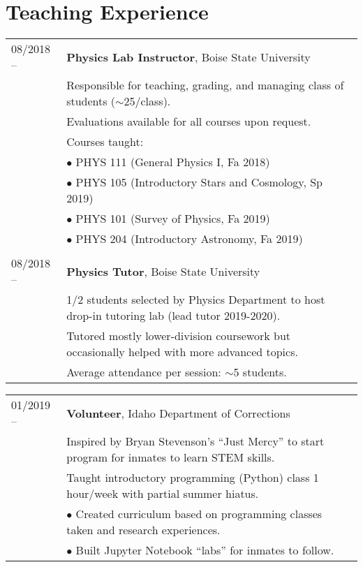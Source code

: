 \documentclass[11pt]{article}
\begin{document}
\section{Teaching Experience}
\begin{tabular}{ll}
08/2018 --		& 	\textbf{Physics Lab Instructor}, Boise State University \vspace{1mm} \\
      & Responsible for teaching, grading, and managing class of students ($\sim$25/class).\\
      & Evaluations available for all courses upon request. \vspace{2mm} \\
      & Courses taught:\\
      & $\bullet$ PHYS 111 (General Physics I, Fa 2018)\\
      & $\bullet$ PHYS 105 (Introductory Stars and Cosmology, Sp 2019)\\
      & $\bullet$ PHYS 101 (Survey of Physics, Fa 2019)\\
      & $\bullet$ PHYS 204 (Introductory Astronomy, Fa 2019)\\
      & \\
08/2018 --    &   \textbf{Physics Tutor}, Boise State University \vspace{1mm} \\
      & 1/2 students selected by Physics Department to host drop-in tutoring lab (lead tutor 2019-2020).\\
      & Tutored mostly lower-division coursework but occasionally helped with more advanced topics.\\
      & Average attendance per session: $\sim$5 students.\\

\end{tabular}
\newpage
\begin{tabular}{ll}
01/2019 --    &   \textbf{Volunteer}, Idaho Department of Corrections \\
      & Inspired by Bryan Stevenson's ``Just Mercy'' to start program for inmates to learn STEM skills.\vspace{2mm} \\
      & Taught introductory programming (Python) class 1 hour/week with partial summer hiatus.\\
      & $\bullet$ Created curriculum based on programming classes taken and research experiences.\\
      & $\bullet$ Built Jupyter Notebook ``labs'' for inmates to follow.
\end{tabular}
\end{document}
